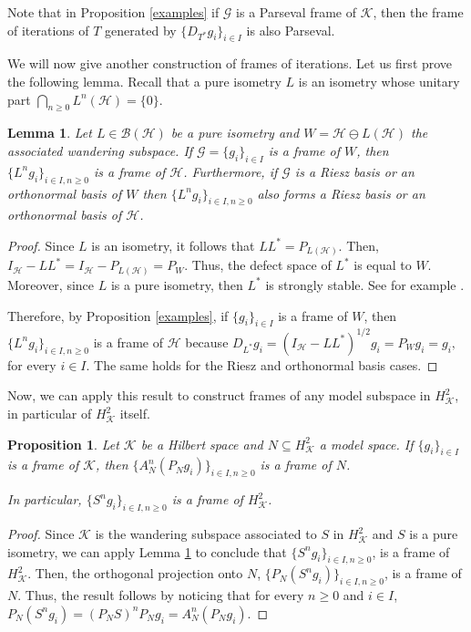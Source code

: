 \documentclass[a4paper,12pt]{amsart}
\def\cB{{\mathcal{B}}}
\def\HH{{\mathcal{H}}}
\def\KK{{\mathcal{K}}}
\def\GG{{\mathcal{G}}}
\newtheorem{lemma}[theorem]{Lemma}
\newtheorem{proposition}[theorem]{Proposition}
\theoremstyle{definition}
\begin{document}
Note that in Proposition \ref{examples} if $\GG$ is a Parseval frame of $\KK$, then the frame of iterations of $T$ generated by $\{D_{T^*}g_{i}\}_{i\in I}$ is also Parseval. 

We will now give another construction of frames of iterations.
Let us first prove the follo\-wing lemma. Recall that a pure isometry $L$ is an isometry whose unitary part $\bigcap_{n\geqslant 0}L^n(\HH)=\{0\}.$ 

\begin{lemma}\label{lem:wandering-frame}
Let $L\in\cB(\HH)$ be a pure isometry and $W=\HH\ominus L(\HH)$ the associated wandering subspace. If $\GG=\{g_i\}_{i\in I}$ is a frame of $W$, then $\{L^n g_i\}_{i\in I,n\geqslant0}$ is a frame of $\HH$.
Furthermore, if $\GG$ is a Riesz basis or an orthonormal basis of $W$ then $\{L^n g_i\}_{i\in I,n\geqslant0}$ also forms a Riesz basis or an orthonormal basis of $\HH$.
\end{lemma}
\begin{proof}
 Since  $L$ is an isometry, it follows that $LL^* = P_{L(\HH)}$. Then, $I_{\mathcal{H}} - LL^* = I_{\HH} - P_{L(\HH)} = P_W$. Thus, the defect space of $L^*$ is equal to $W$. Moreover, since $L$ is a pure isometry, then $L^*$ is strongly stable. See for example \cite[Section 1.3]{RR85}.

Therefore, by Proposition \ref{examples},
if $\{g_i\}_{i\in I}$ is a frame of $W$, then $\{L^ng_i\}_{i\in I, n\geqslant 0}$ is a frame of $\HH$ because $D_{L^*}g_i = (I_{\HH} - LL^*)^{1/2} g_i = P_W g_i= g_i,$ for every $i\in I$.
The same holds for the Riesz and orthonormal basis cases.
\end{proof}

Now, we can apply this result to construct frames of any model subspace in $H^2_\KK$, in particular of $H^2_\KK$ itself. 

\begin{proposition}\label{propV}
Let $\KK$ be a Hilbert space and $N\subseteq H^2_\KK$ a model space. 
If $\{g_i\}_{i\in I}$ is a frame of $\KK$, then $\{A^n_N(P_N g_i)\}_{i\in I, n\geqslant0}$ is a frame of $N$.

In particular, $\{S^n g_i\}_{i\in I, n\geqslant0}$ is a frame of $H^2_\KK$.
\end{proposition}
\begin{proof}
Since $\KK$ is the wandering subspace associated to $S$ in $H^2_\KK$ and $S$ is a pure isometry, we can apply Lemma \ref{lem:wandering-frame} to conclude that $\{S^ng_i\}_{i\in I, n\geqslant0}$, is a frame of $H^2_\KK$. Then, the orthogonal projection onto $N$, $\{P_N(S^ng_i)\}_{i\in I, n\geqslant0}$, is a frame of $N$. 
Thus, the result follows by noticing that for every $n\geqslant0$ and $i\in I$, $P_N(S^ng_i) = (P_NS)^n P_N g_i = A^n_N(P_Ng_i)$.
\end{proof}
\end{document}
